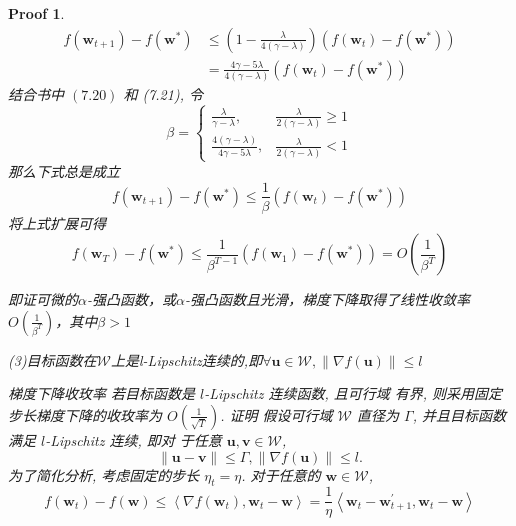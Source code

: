 \documentclass[a4paper,UTF8]{article}
\numberwithin{equation}{section}
\newtheorem*{myProof}{Proof}
\begin{document}
\begin{myProof}
		$$
		\begin{aligned}
			f\left(\boldsymbol{w}_{t+1}\right)-f\left(\boldsymbol{w}^{*}\right) & \leqslant\left(1-\frac{\lambda}{4(\gamma-\lambda)}\right)\left(f\left(\boldsymbol{w}_{t}\right)-f\left(\boldsymbol{w}^{*}\right)\right) \\
			&=\frac{4 \gamma-5 \lambda}{4(\gamma-\lambda)}\left(f\left(\boldsymbol{w}_{t}\right)-f\left(\boldsymbol{w}^{*}\right)\right)
		\end{aligned}
		$$
		结合书中 $(7.20)$ 和 (7.21), 令
		$$
		\beta= \begin{cases}\frac{\lambda}{\gamma-\lambda}, & \frac{\lambda}{2(\gamma-\lambda)} \geqslant 1 \\ \frac{4(\gamma-\lambda)}{4 \gamma-5 \lambda}, & \frac{\lambda}{2(\gamma-\lambda)}<1\end{cases}
		$$
		那么下式总是成立
		$$
		f\left(\boldsymbol{w}_{t+1}\right)-f\left(\boldsymbol{w}^{*}\right) \leqslant \frac{1}{\beta}\left(f\left(\boldsymbol{w}_{t}\right)-f\left(\boldsymbol{w}^{*}\right)\right)
		$$
		将上式扩展可得
		$$
		f\left(\boldsymbol{w}_{T}\right)-f\left(\boldsymbol{w}^{*}\right) \leqslant \frac{1}{\beta^{T-1}}\left(f\left(\boldsymbol{w}_{1}\right)-f\left(\boldsymbol{w}^{*}\right)\right)=O\left(\frac{1}{\beta^{T}}\right)
		$$ 
		
		即证可微的$\alpha$-强凸函数，或$\alpha$-强凸函数且光滑，梯度下降取得了线性收敛率$O\left(\frac{1}{\beta^{T}}\right)$，其中$\beta > 1$
		
		(3)目标函数在$\mathcal{W}$上是l-Lipschitz连续的,即$\forall \boldsymbol{u} \in \mathcal{W},\|\nabla f(\boldsymbol{u})\| \leqslant l$
		
		梯度下降收玫率 若目标函数是 $l$-Lipschitz 连续函数, 且可行域 有界, 则采用固定步长梯度下降的收玫率为 $O\left(\frac{1}{\sqrt{T}}\right)$.
		证明 假设可行域 $\mathcal{W}$ 直径为 $\Gamma$, 并且目标函数满足 $l$-Lipschitz 连续, 即对 于任意 $\boldsymbol{u}, \boldsymbol{v} \in \mathcal{W}$,
		$$
		\|\boldsymbol{u}-\boldsymbol{v}\| \leqslant \Gamma,\|\nabla f(\boldsymbol{u})\| \leqslant l .
		$$
		为了简化分析, 考虑固定的步长 $\eta_{t}=\eta$.
		对于任意的 $\boldsymbol{w} \in \mathcal{W}$,
		$$
		f\left(\boldsymbol{w}_{t}\right)-f(\boldsymbol{w}) \leqslant\left\langle\nabla f\left(\boldsymbol{w}_{t}\right), \boldsymbol{w}_{t}-\boldsymbol{w}\right\rangle=\frac{1}{\eta}\left\langle\boldsymbol{w}_{t}-\boldsymbol{w}_{t+1}^{\prime}, \boldsymbol{w}_{t}-\boldsymbol{w}\right\rangle
		$$
		

\end{myProof}
\end{document}
